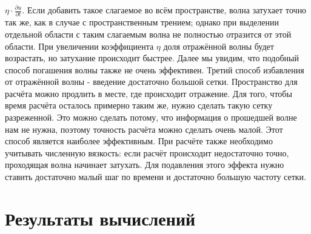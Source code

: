 \documentclass[
11pt,%
tightenlines,%
twoside,%
onecolumn,%
nofloats,%
nobibnotes,%
nofootinbib,%
superscriptaddress,%
noshowpacs,%
centertags]%
{revtex4}
\begin{document}
$\eta \cdot \frac{\partial u}{\partial t}$. Если добавить такое слагаемое во всём пространстве, волна
затухает точно так же, как в случае с пространственным трением; однако при выделении отдельной области
с таким слагаемым волна не полностью отразится от этой области. При увеличении коэффициента $\eta$ 
доля отражённой волны будет возрастать, но затухание происходит быстрее. Далее мы увидим, что 
подобный способ погашения волны также не очень эффективен. \newline
Третий способ избавления от отражённой волны - введение достаточно большой сетки. Пространство для 
расчёта можно продлить в месте, где происходит отражение. Для того, чтобы время 
расчёта осталось примерно таким же, нужно сделать такую сетку разреженной. Это можно сделать потому, 
что информация о прошедшей волне нам не нужна, поэтому точность расчёта можно сделать очень малой. 
Этот способ является наиболее эффективным. \newline
При расчёте также необходимо учитывать численную вязкость: если расчёт происходит недостаточно точно,
проходящая волна начинает затухать. Для подавления этого эффекта нужно ставить достаточно малый шаг
по времени и достаточно большую частоту сетки.


\section{Результаты вычислений}
\end{document}
